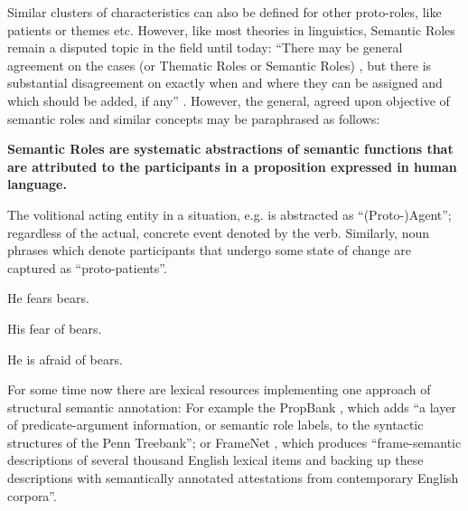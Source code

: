 Similar clusters of characteristics can also be defined for other proto-roles, like
patients or themes etc. However, like most theories in linguistics, Semantic Roles
remain a disputed topic in the field until today: ``There may be general agreement on
the cases (or Thematic Roles or Semantic Roles) \textelp{}, but there is substantial
disagreement on exactly when and where they can be assigned and which \textelp{}
should be added, if any'' \citep{palmer2010semantic}. However, the general, agreed
upon objective of semantic roles and similar concepts may be paraphrased as follows:

\begin{examples}
  \item \textbf{Semantic Roles are systematic abstractions of semantic functions that are attributed
  to the participants in a proposition expressed in human language.}
\end{examples}

The volitional acting entity in a situation, e.g. is
abstracted as ``(Proto-)Agent''; regardless of the actual, concrete event denoted by
the verb. Similarly, noun phrases which denote participants that undergo some state
of change are captured as ``proto-patients''.

\begin{examples}
  \item He fears bears.
  \item His fear of bears.
  \item He is afraid of bears.
\end{examples}

For some time now there are lexical resources implementing one approach of structural
semantic annotation: For example the PropBank \citep{palmer2005proposition}, which adds
``a layer of predicate-argument information, or semantic role labels, to the syntactic
structures of the Penn Treebank''; or FrameNet \citep{baker1998berkeley}, which produces
``frame-semantic descriptions of several thousand English lexical items and backing up
these descriptions with semantically annotated attestations from contemporary English
corpora''.


